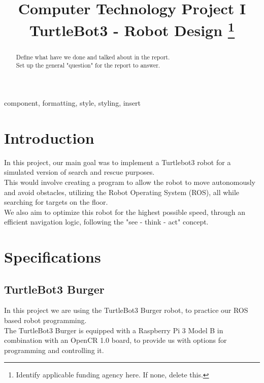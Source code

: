 \documentclass[conference]{IEEEtran}
\begin{document}
\title{Computer Technology Project I\\
{\large TurtleBot3 - Robot Design}
\thanks{Identify applicable funding agency here. If none, delete this.}
}

\author{
\and
{}
}

\maketitle

\begin{abstract}
Define what have we done and talked about in the report.\\
Set up the general "question" for the report to answer.\\
\end{abstract}

\begin{IEEEkeywords}
component, formatting, style, styling, insert
\end{IEEEkeywords}

\section{Introduction}
In this project, our main goal was to implement a Turtlebot3 robot for a simulated version of search and rescue purposes.\\
This would involve creating a program to allow the robot to move autonomously and avoid obstacles, utilizing the 
Robot Operating System (ROS), all while searching for targets on the floor.\\
We also aim to optimize this robot for the highest possible speed, through an efficient navigation logic, 
following the "see - think - act" concept.\\


\section{Specifications}
\subsection{TurtleBot3 Burger}
In this project we are using the TurtleBot3 Burger robot, to practice our ROS based robot programming.\\
The TurtleBot3 Burger is equipped with a Raspberry Pi 3 Model B \cite{b1} in combination with an OpenCR 1.0 board, to 
provide us with options for programming and controlling it. \\
\end{document}
